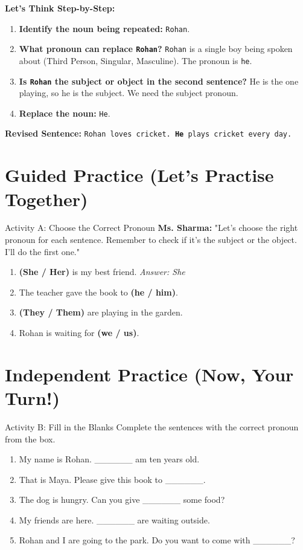 \textbf{Let's Think Step-by-Step:}
\begin{enumerate}
    \item \textbf{Identify the noun being repeated:} \texttt{Rohan}.
    \item \textbf{What pronoun can replace \texttt{Rohan}?} \texttt{Rohan} is a single boy being spoken about (Third Person, Singular, Masculine). The pronoun is \texttt{he}.
    \item \textbf{Is \texttt{Rohan} the subject or object in the second sentence?} He is the one playing, so he is the subject. We need the subject pronoun.
    \item \textbf{Replace the noun:} \texttt{He}.
\end{enumerate}
\textbf{Revised Sentence:} \texttt{Rohan loves cricket. \textbf{He} plays cricket every day.}

\section{Guided Practice (Let's Practise Together)}
\begin{activitybox}{Activity A: Choose the Correct Pronoun}
\textbf{Ms. Sharma:} "Let's choose the right pronoun for each sentence. Remember to check if it's the subject or the object. I'll do the first one."
\begin{enumerate}
    \item \textbf{(She / Her)} is my best friend. \textit{Answer: She}
    \item The teacher gave the book to \textbf{(he / him)}.
    \item \textbf{(They / Them)} are playing in the garden.
    \item Rohan is waiting for \textbf{(we / us)}.
\end{enumerate}
\end{activitybox}

\section{Independent Practice (Now, Your Turn!)}
\begin{activitybox}{Activity B: Fill in the Blanks}
Complete the sentences with the correct pronoun from the box.


\begin{enumerate}
    \item My name is Rohan. ______ am ten years old.
    \item That is Maya. Please give this book to ______.
    \item The dog is hungry. Can you give ______ some food?
    \item My friends are here. ______ are waiting outside.
    \item Rohan and I are going to the park. Do you want to come with ______?
\end{enumerate}
\end{activitybox}

